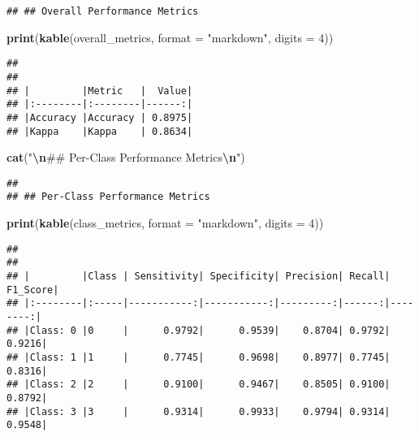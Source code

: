 \documentclass[
]{article}
\newenvironment{Shaded}{\begin{snugshade}}{\end{snugshade}}
\newcommand{\AttributeTok}[1]{\textcolor[rgb]{0.13,0.29,0.53}{#1}}
\newcommand{\DecValTok}[1]{\textcolor[rgb]{0.00,0.00,0.81}{#1}}
\newcommand{\FunctionTok}[1]{\textcolor[rgb]{0.13,0.29,0.53}{\textbf{#1}}}
\newcommand{\NormalTok}[1]{#1}
\newcommand{\SpecialCharTok}[1]{\textcolor[rgb]{0.81,0.36,0.00}{\textbf{#1}}}
\newcommand{\StringTok}[1]{\textcolor[rgb]{0.31,0.60,0.02}{#1}}
\begin{document}
\begin{verbatim}
## ## Overall Performance Metrics
\end{verbatim}

\begin{Shaded}
\begin{Highlighting}[]
\FunctionTok{print}\NormalTok{(}\FunctionTok{kable}\NormalTok{(overall\_metrics, }\AttributeTok{format =} \StringTok{"markdown"}\NormalTok{, }\AttributeTok{digits =} \DecValTok{4}\NormalTok{))}
\end{Highlighting}
\end{Shaded}

\begin{verbatim}
## 
## 
## |         |Metric   |  Value|
## |:--------|:--------|------:|
## |Accuracy |Accuracy | 0.8975|
## |Kappa    |Kappa    | 0.8634|
\end{verbatim}

\begin{Shaded}
\begin{Highlighting}[]
\FunctionTok{cat}\NormalTok{(}\StringTok{"}\SpecialCharTok{\textbackslash{}n}\StringTok{\#\# Per{-}Class Performance Metrics}\SpecialCharTok{\textbackslash{}n}\StringTok{"}\NormalTok{)}
\end{Highlighting}
\end{Shaded}

\begin{verbatim}
## 
## ## Per-Class Performance Metrics
\end{verbatim}

\begin{Shaded}
\begin{Highlighting}[]
\FunctionTok{print}\NormalTok{(}\FunctionTok{kable}\NormalTok{(class\_metrics, }\AttributeTok{format =} \StringTok{"markdown"}\NormalTok{, }\AttributeTok{digits =} \DecValTok{4}\NormalTok{))}
\end{Highlighting}
\end{Shaded}

\begin{verbatim}
## 
## 
## |         |Class | Sensitivity| Specificity| Precision| Recall| F1_Score|
## |:--------|:-----|-----------:|-----------:|---------:|------:|--------:|
## |Class: 0 |0     |      0.9792|      0.9539|    0.8704| 0.9792|   0.9216|
## |Class: 1 |1     |      0.7745|      0.9698|    0.8977| 0.7745|   0.8316|
## |Class: 2 |2     |      0.9100|      0.9467|    0.8505| 0.9100|   0.8792|
## |Class: 3 |3     |      0.9314|      0.9933|    0.9794| 0.9314|   0.9548|
\end{verbatim}
\end{document}
